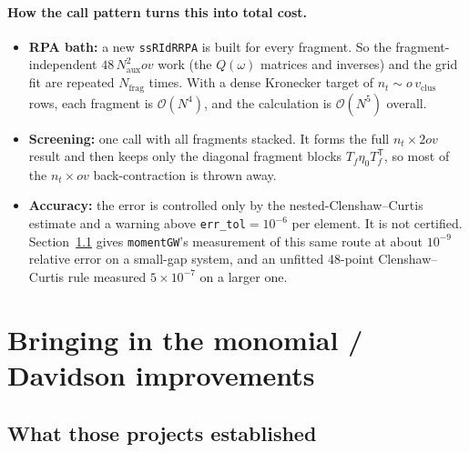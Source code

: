 \documentclass[11pt,a4paper]{article}
\newcommand{\code}[1]{\texttt{\small #1}}
\newcommand{\Naux}{N_{\mathrm{aux}}}
\newcommand{\nt}{n_{t}}
\newcommand{\Nfrag}{N_{\mathrm{frag}}}
\newcommand{\ov}{ov}
\begin{document}
\paragraph{How the call pattern turns this into total cost.}
\begin{itemize}
  \item \textbf{RPA bath:} a new \code{ssRIdRRPA} is built for every fragment. So the
        fragment-independent $48\,\Naux^2\ov$ work (the $Q(\omega)$ matrices and inverses) and
        the grid fit are repeated $\Nfrag$ times. With a dense Kronecker target of
        $\nt\sim o\,v_{\mathrm{clus}}$ rows, each fragment is $\mathcal{O}(N^4)$, and the
        calculation is $\mathcal{O}(N^5)$ overall.
  \item \textbf{Screening:} one call with all fragments stacked. It forms the full
        $\nt\times2\ov$ result and then keeps only the diagonal fragment blocks
        $T_f\eta_0T_f^{\mathsf T}$, so most of the $\nt\times\ov$ back-contraction is thrown away.
  \item \textbf{Accuracy:} the error is controlled only by the nested-Clenshaw--Curtis
        estimate and a warning above \code{err\_tol}$=10^{-6}$ per element. It is not
        certified. Section~\ref{sec:established} gives \code{momentGW}'s measurement of this same
        route at about $10^{-9}$ relative error on a small-gap system, and an unfitted 48-point
        Clenshaw--Curtis rule measured $5\times10^{-7}$ on a larger one.
\end{itemize}

\section{Bringing in the monomial / Davidson improvements}

\subsection{What those projects established}\label{sec:established}
\end{document}
